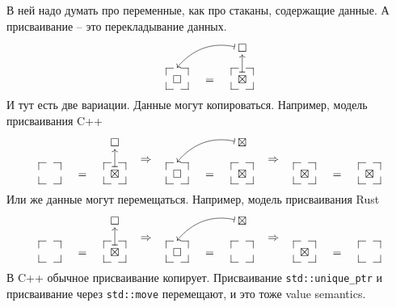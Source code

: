 В ней надо думать про переменные, как про стаканы, содержащие данные.
А присваивание -- это перекладывание данных.
\[
\xymatrix@R=15pt@C=15pt{
{}&{}&{\square}\ar@{|->}@/_10pt/[lld]+(0,4)\\
{\square}
{\save
[].[]*+[F--]\frm{}
\restore}
&{=}&{\boxtimes}\ar@{|->}[u]
{\save
[].[]*+[F--]\frm{}
\restore}
}
\]
И тут есть две вариации.
Данные могут копироваться.
Например, модель присваивания C++
\[
\begin{aligned}
\xymatrix@R=15pt@C=15pt{
{}&{}&{\square}\\
{\phantom{\boxtimes}}
{\save
[].[]*+[F--]\frm{}
\restore}
&{=}&{\boxtimes}\ar@{|->}[u]
{\save
[].[]*+[F--]\frm{}
\restore}
}
\end{aligned}
\quad\Rightarrow\quad
\begin{aligned}
\xymatrix@R=15pt@C=15pt{
{}&{}&{\boxtimes}\ar@{|->}@/_10pt/[lld]+(0,4)\\
{\square}
{\save
[].[]*+[F--]\frm{}
\restore}
&{=}&{\boxtimes}
{\save
[].[]*+[F--]\frm{}
\restore}
}
\end{aligned}
\quad\Rightarrow\quad
\begin{aligned}
\xymatrix@R=15pt@C=15pt{
{}&{}&{\phantom{\boxtimes}}\\
{\boxtimes}
{\save
[].[]*+[F--]\frm{}
\restore}
&{=}&{\boxtimes}
{\save
[].[]*+[F--]\frm{}
\restore}
}
\end{aligned}
\]
Или же данные могут перемещаться.
Например, модель присваивания Rust
\[
\begin{aligned}
\xymatrix@R=15pt@C=15pt{
{}&{}&{\square}\\
{\phantom{\boxtimes}}
{\save
[].[]*+[F--]\frm{}
\restore}
&{=}&{\boxtimes}\ar@{|->}[u]
{\save
[].[]*+[F--]\frm{}
\restore}
}
\end{aligned}
\quad\Rightarrow\quad
\begin{aligned}
\xymatrix@R=15pt@C=15pt{
{}&{}&{\boxtimes}\ar@{|->}@/_10pt/[lld]+(0,4)\\
{\square}
{\save
[].[]*+[F--]\frm{}
\restore}
&{=}&{\phantom{\boxtimes}}
{\save
[].[]*+[F--]\frm{}
\restore}
}
\end{aligned}
\quad\Rightarrow\quad
\begin{aligned}
\xymatrix@R=15pt@C=15pt{
{}&{}&{\phantom{\boxtimes}}\\
{\boxtimes}
{\save
[].[]*+[F--]\frm{}
\restore}
&{=}&{\phantom{\boxtimes}}
{\save
[].[]*+[F--]\frm{}
\restore}
}
\end{aligned}
\]
В C++ обычное присваивание копирует. Присваивание \verb"std::unique_ptr" и присваивание через \verb"std::move" перемещают, и это тоже value semantics.
